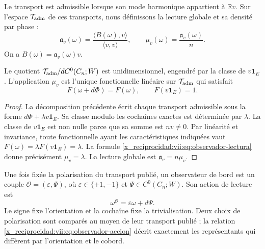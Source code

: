 \begin{definition}
\label{x_reciprocidad:vii:def:observador-admisible}
Le transport est admissible lorsque son mode harmonique appartient à
\(\mathbb Rv\). Sur l'espace \(\mathcal T_{\rm adm}\) de ces
transports, nous définissons la lecture globale et sa densité par phase :
\begin{equation}
 \mathfrak a_v(\omega)
 =\frac{\langle B(\omega),v\rangle}{\langle v,v\rangle},
 \qquad
 \mu_v(\omega)=\frac{\mathfrak a_v(\omega)}n.
 \label{x_reciprocidad:vii:eq:observador-lectura}
\end{equation}
On a \(B(\omega)=\mathfrak a_v(\omega)v\).
\end{definition}

\begin{theorem}
\label{x_reciprocidad:vii:thm:observador-unicidad}
Le quotient
\(\mathcal T_{\rm adm}/dC^0(C_n;W)\) est unidimensionnel, engendré
par la classe de \(v\mathbf1_E\). L'application \(\mu_v\) est l'unique
fonctionnelle linéaire sur \(\mathcal T_{\rm adm}\) qui satisfait
\[
 F(\omega+d\Phi)=F(\omega),\qquad F(v\mathbf1_E)=1.
\]
\end{theorem}

\begin{proof}
La décomposition précédente écrit chaque transport admissible sous la forme
\(d\Phi+\lambda v\mathbf1_E\). Sa classe modulo les cochaînes exactes
est déterminée par \(\lambda\). La classe de \(v\mathbf1_E\)
est non nulle parce que sa somme est \(nv\neq0\). Par linéarité et
invariance, toute fonctionnelle ayant les caractéristiques indiquées vaut
\(F(\omega)=\lambda F(v\mathbf1_E)=\lambda\). La formule
\eqref{x_reciprocidad:vii:eq:observador-lectura} donne précisément \(\mu_v=\lambda\).
La lecture globale est \(\mathfrak a_v=n\mu_v\).
\end{proof}

\begin{definition}
\label{x_reciprocidad:vii:def:observador-borde}
Une fois fixée la polarisation du transport publié, un observateur de bord
est un couple \(\mathcal O=(\varepsilon,\Psi)\), où
\(\varepsilon\in\{+1,-1\}\) et \(\Psi\in C^0(C_n;W)\).
Son action de lecture est
\begin{equation}
 \omega^{\mathcal O}=\varepsilon\omega+d\Psi.
 \label{x_reciprocidad:vii:eq:observador-accion}
\end{equation}
Le signe fixe l'orientation et la cochaîne fixe la trivialisation. Deux choix de polarisation sont comparés au moyen de leur transport publié ; la relation \eqref{x_reciprocidad:vii:eq:observador-accion} décrit exactement les représentants qui diffèrent par l'orientation et le cobord.
\end{definition}

